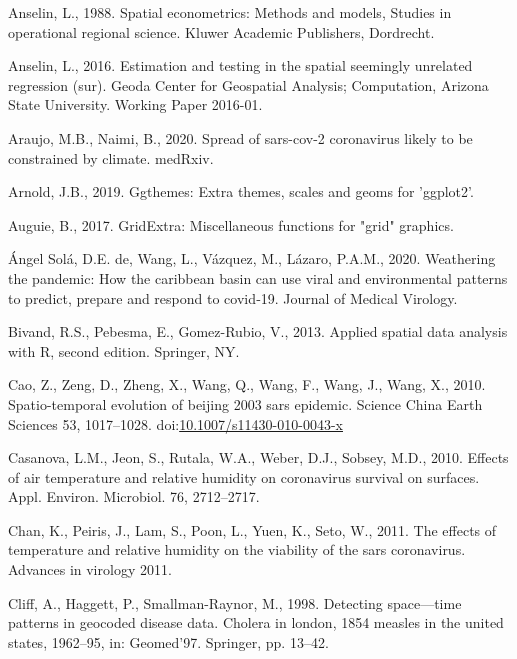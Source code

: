 \documentclass[]{elsarticle} %
\begin{document}
\leavevmode\hypertarget{ref-Anselin1988spatial}{}%
Anselin, L., 1988. Spatial econometrics: Methods and models, Studies in
operational regional science. Kluwer Academic Publishers, Dordrecht.

\leavevmode\hypertarget{ref-Anselin2016estimation}{}%
Anselin, L., 2016. Estimation and testing in the spatial seemingly
unrelated regression (sur). Geoda Center for Geospatial Analysis;
Computation, Arizona State University. Working Paper 2016-01.

\leavevmode\hypertarget{ref-Araujo2020spread}{}%
Araujo, M.B., Naimi, B., 2020. Spread of sars-cov-2 coronavirus likely
to be constrained by climate. medRxiv.

\leavevmode\hypertarget{ref-Arnold2019}{}%
Arnold, J.B., 2019. Ggthemes: Extra themes, scales and geoms for
'ggplot2'.

\leavevmode\hypertarget{ref-Auguie2017gridextra}{}%
Auguie, B., 2017. GridExtra: Miscellaneous functions for "grid"
graphics.

\leavevmode\hypertarget{ref-deangel2020weathering}{}%
Ángel Solá, D.E. de, Wang, L., Vázquez, M., Lázaro, P.A.M., 2020.
Weathering the pandemic: How the caribbean basin can use viral and
environmental patterns to predict, prepare and respond to covid‐19.
Journal of Medical Virology.

\leavevmode\hypertarget{ref-Bivand2013}{}%
Bivand, R.S., Pebesma, E., Gomez-Rubio, V., 2013. Applied spatial data
analysis with R, second edition. Springer, NY.

\leavevmode\hypertarget{ref-Cao2010spatio}{}%
Cao, Z., Zeng, D., Zheng, X., Wang, Q., Wang, F., Wang, J., Wang, X.,
2010. Spatio-temporal evolution of beijing 2003 sars epidemic. Science
China Earth Sciences 53, 1017--1028.
doi:\href{https://doi.org/10.1007/s11430-010-0043-x}{10.1007/s11430-010-0043-x}

\leavevmode\hypertarget{ref-Casanova2010effects}{}%
Casanova, L.M., Jeon, S., Rutala, W.A., Weber, D.J., Sobsey, M.D., 2010.
Effects of air temperature and relative humidity on coronavirus survival
on surfaces. Appl. Environ. Microbiol. 76, 2712--2717.

\leavevmode\hypertarget{ref-Chan2011effects}{}%
Chan, K., Peiris, J., Lam, S., Poon, L., Yuen, K., Seto, W., 2011. The
effects of temperature and relative humidity on the viability of the
sars coronavirus. Advances in virology 2011.

\leavevmode\hypertarget{ref-Cliff1998detecting}{}%
Cliff, A., Haggett, P., Smallman-Raynor, M., 1998. Detecting
space---time patterns in geocoded disease data. Cholera in london, 1854
measles in the united states, 1962--95, in: Geomed'97. Springer, pp.
13--42.
\end{document}
